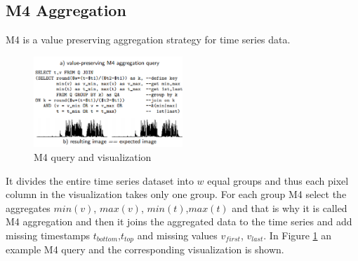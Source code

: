 \subsection{M4 Aggregation}
M4 is a value preserving aggregation strategy for time series data.
\begin{figure}[h]
	\includegraphics[width=0.5\textwidth]{m4}
	\caption{M4 query and visualization}   
	\label{fig:2}
\end{figure}
It divides the entire time series dataset into $w$ equal groups and thus each pixel column in the visualization takes only one group. For each group M4 select the aggregates $min(v)$,
$max(v)$, $min(t)$,$max(t)$ and that is why it is called M4 aggregation and then it joins the aggregated data to the time series and add missing timestamps $t_{bottom}$,$t_{top}$ and missing values $v_{first}$, $v_{last}$. In Figure \ref{fig:2} an example M4 query and 
the corresponding visualization is shown.